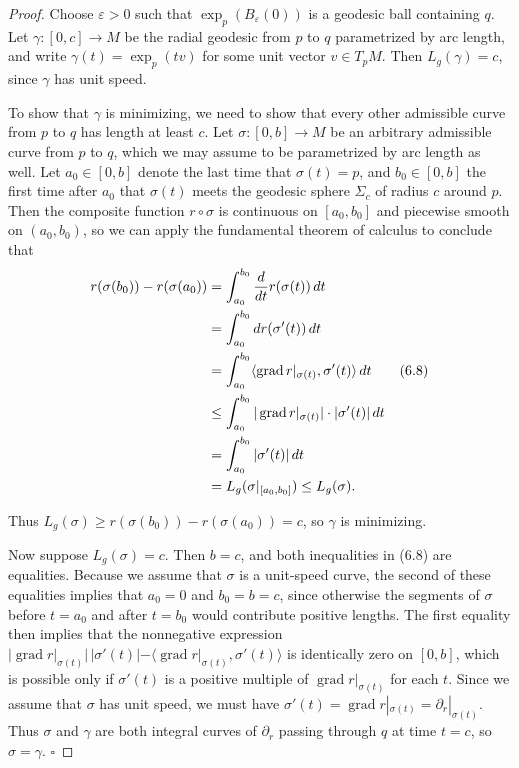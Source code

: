 \begin{proof}
Choose $\varepsilon > 0$ such that $\exp_p(B_\varepsilon(0))$ is a geodesic ball containing $q$. Let $\gamma: [0, c] \to M$ be the radial geodesic from $p$ to $q$ parametrized by arc length, and write $\gamma(t) = \exp_p(tv)$ for some unit vector $v \in T_p M$. Then $L_g(\gamma) = c$, since $\gamma$ has unit speed.

To show that $\gamma$ is minimizing, we need to show that every other admissible curve from $p$ to $q$ has length at least $c$. Let $\sigma: [0, b] \to M$ be an arbitrary admissible curve from $p$ to $q$, which we may assume to be parametrized by arc length as well. Let $a_0 \in [0, b]$ denote the last time that $\sigma(t) = p$, and $b_0 \in [0, b]$ the first time after $a_0$ that $\sigma(t)$ meets the geodesic sphere $\Sigma_c$ of radius $c$ around $p$. Then the composite function $r \circ \sigma$ is continuous on $[a_0, b_0]$ and piecewise smooth on $(a_0, b_0)$, so we can apply the fundamental theorem of calculus to conclude that
\begin{align}
r(\sigma(b_0)) - r(\sigma(a_0)) &= \int_{a_0}^{b_0} \frac{d}{dt} r(\sigma(t)) \, dt \notag\\
&= \int_{a_0}^{b_0} dr(\sigma'(t)) \, dt \notag\\
&= \int_{a_0}^{b_0} \langle \operatorname{grad} r|_{\sigma(t)}, \sigma'(t) \rangle \, dt \tag{6.8}\\
&\le \int_{a_0}^{b_0} |\operatorname{grad} r|_{\sigma(t)}| \cdot |\sigma'(t)| \, dt \notag\\
&= \int_{a_0}^{b_0} |\sigma'(t)| \, dt \notag\\
&= L_g(\sigma|_{[a_0,b_0]}) \le L_g(\sigma). \notag
\end{align}

Thus $L_g(\sigma) \ge r(\sigma(b_0)) - r(\sigma(a_0)) = c$, so $\gamma$ is minimizing.

Now suppose $L_g(\sigma) = c$. Then $b = c$, and both inequalities in (6.8) are equalities. Because we assume that $\sigma$ is a unit-speed curve, the second of these equalities implies that $a_0 = 0$ and $b_0 = b = c$, since otherwise the segments of $\sigma$ before $t = a_0$ and after $t = b_0$ would contribute positive lengths. The first equality then implies that the nonnegative expression $|\operatorname{grad} r|_{\sigma(t)}| \, |\sigma'(t)| - \langle \operatorname{grad} r|_{\sigma(t)}, \sigma'(t) \rangle$ is identically zero on $[0, b]$, which is possible only if $\sigma'(t)$ is a positive multiple of $\operatorname{grad} r|_{\sigma(t)}$ for each $t$. Since we assume that $\sigma$ has unit speed, we must have $\sigma'(t) = \operatorname{grad} r|_{\sigma(t)} = \partial_r|_{\sigma(t)}$. Thus $\sigma$ and $\gamma$ are both integral curves of $\partial_r$ passing through $q$ at time $t = c$, so $\sigma = \gamma$. $\square$
\end{proof}

